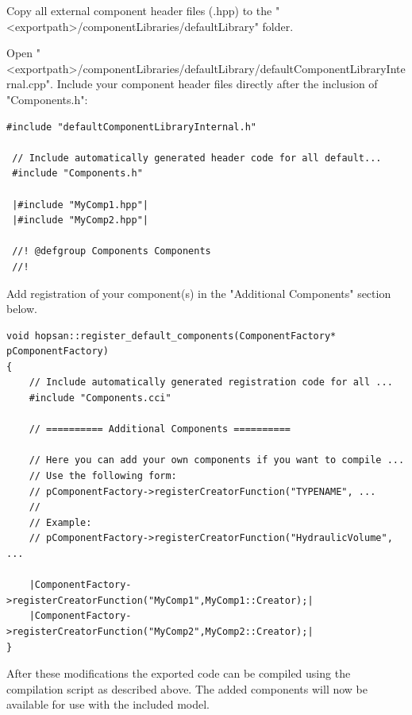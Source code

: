 \documentclass[a4paper]{article}
\begin{document}
\begin{enumerate}
Copy all external component header files (.hpp) to the "<exportpath>/componentLibraries/defaultLibrary" folder.

Open "<exportpath>/componentLibraries/defaultLibrary/defaultComponentLibraryInternal.cpp". Include your component header files directly after the inclusion of "Components.h":

\newcommand{\hilight}{\makebox[0pt][l]{%
		\color{yellow}\rule[-4pt]{1\linewidth}{14pt}}%
}



\begin{lstlisting}[style=base]
 #include "defaultComponentLibraryInternal.h"

 // Include automatically generated header code for all default...
 #include "Components.h"
 
 |#include "MyComp1.hpp"|  
 |#include "MyComp2.hpp"|

 //! @defgroup Components Components
 //!
\end{lstlisting}

Add registration of your component(s) in the "Additional Components" section below.

\begin{lstlisting}[style=base]
void hopsan::register_default_components(ComponentFactory* pComponentFactory)
{
    // Include automatically generated registration code for all ...
    #include "Components.cci"
	
    // ========== Additional Components ==========
	
    // Here you can add your own components if you want to compile ...
    // Use the following form:
    // pComponentFactory->registerCreatorFunction("TYPENAME", ...
    //
    // Example:
    // pComponentFactory->registerCreatorFunction("HydraulicVolume", ...
	
    |ComponentFactory->registerCreatorFunction("MyComp1",MyComp1::Creator);|
    |ComponentFactory->registerCreatorFunction("MyComp2",MyComp2::Creator);|
}
\end{lstlisting}
\end{enumerate}

\noindent After these modifications the exported code can be compiled using the compilation script as described above.
The added components will now be available for use with the included model.
\end{document}
